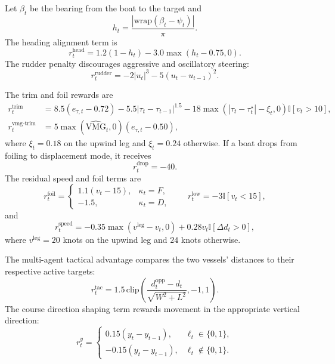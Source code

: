 \documentclass{article}
\begin{document}
Let $\beta_t$ be the bearing from the boat to the target and
\begin{equation}
    h_t = \frac{|\mathrm{wrap}(\beta_t-\psi_t)|}{\pi}.
\end{equation}
The heading alignment term is
\begin{equation}
    r^{\mathrm{head}}_t =
    1.2(1-h_t)-3.0\max(h_t-0.75,0).
\end{equation}
The rudder penalty discourages aggressive and oscillatory steering:
\begin{equation}
    r^{\mathrm{rudder}}_t =
    -2|u_t|^3 -5(u_t-u_{t-1})^2.
\end{equation}

The trim and foil rewards are
\begin{align}
    r^{\mathrm{trim}}_t
    &=
    8.5(e_{\tau,t}-0.72)
    -5.5|\tau_t-\tau_{t-1}|^{1.5}
    -18\max(|\tau_t-\tau_t^\star|-\xi_t,0)\mathbb{I}[v_t>10],\\
    r^{\mathrm{vmg\mbox{-}trim}}_t
    &=
    5\max(\widehat{\mathrm{VMG}}_t,0)(e_{\tau,t}-0.50),
\end{align}
where $\xi_t=0.18$ on the upwind leg and $\xi_t=0.24$ otherwise. If a boat drops from foiling to displacement mode, it receives
\begin{equation}
    r^{\mathrm{drop}}_t=-40.
\end{equation}
The residual speed and foil terms are
\begin{equation}
r^{\mathrm{foil}}_t =
\begin{cases}
1.1(v_t-15), & \kappa_t=F,\\
-1.5, & \kappa_t=D,
\end{cases}
\qquad
r^{\mathrm{low}}_t = -3\mathbb{I}[v_t<15],
\end{equation}
and
\begin{equation}
    r^{\mathrm{speed}}_t =
    -0.35\max(v^{\mathrm{leg}}-v_t,0)
    +0.28v_t\mathbb{I}[\Delta d_t>0],
\end{equation}
where $v^{\mathrm{leg}}=20$ knots on the upwind leg and $24$ knots otherwise.

The multi-agent tactical advantage compares the two vessels' distances to their respective active targets:
\begin{equation}
    r^{\mathrm{tac}}_t =
    1.5\,\mathrm{clip}
    \left(
        \frac{d^{\mathrm{opp}}_t-d_t}{\sqrt{W^2+L^2}},
        -1,1
    \right).
\end{equation}
The course direction shaping term rewards movement in the appropriate vertical direction:
\begin{equation}
r^{y}_t=
\begin{cases}
0.15(y_t-y_{t-1}), & \ell_t\in\{0,1\},\\
-0.15(y_t-y_{t-1}), & \ell_t\notin\{0,1\}.
\end{cases}
\end{equation}
\end{document}
